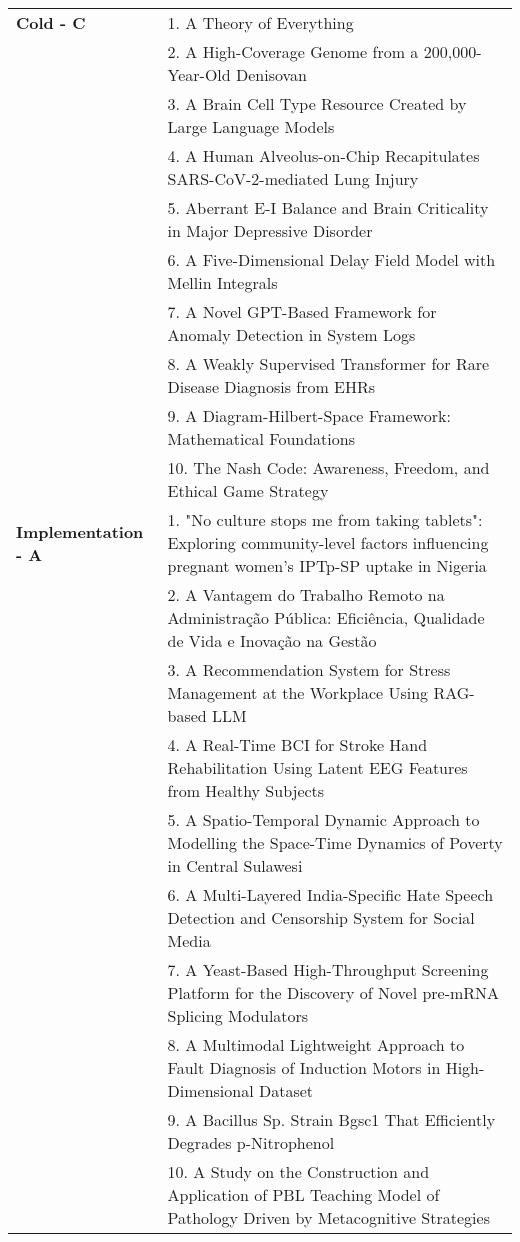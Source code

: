 \documentclass{article}
\begin{document}
\begin{longtable}{p{2.5cm}p{13cm}}
\textbf{Cold - C} & 1. A Theory of Everything \\
& 2. A High-Coverage Genome from a 200,000-Year-Old Denisovan \\
& 3. A Brain Cell Type Resource Created by Large Language Models \\
& 4. A Human Alveolus-on-Chip Recapitulates SARS-CoV-2-mediated Lung Injury \\
& 5. Aberrant E-I Balance and Brain Criticality in Major Depressive Disorder \\
& 6. A Five-Dimensional Delay Field Model with Mellin Integrals \\
& 7. A Novel GPT-Based Framework for Anomaly Detection in System Logs \\
& 8. A Weakly Supervised Transformer for Rare Disease Diagnosis from EHRs \\
& 9. A Diagram-Hilbert-Space Framework: Mathematical Foundations \\
& 10. The Nash Code: Awareness, Freedom, and Ethical Game Strategy \\
\midrule

\textbf{Implementation - A} & 1. "No culture stops me from taking tablets": Exploring community-level factors influencing pregnant women's IPTp-SP uptake in Nigeria \\
& 2. A Vantagem do Trabalho Remoto na Administração Pública: Eficiência, Qualidade de Vida e Inovação na Gestão \\
& 3. A Recommendation System for Stress Management at the Workplace Using RAG-based LLM \\
& 4. A Real-Time BCI for Stroke Hand Rehabilitation Using Latent EEG Features from Healthy Subjects \\
& 5. A Spatio-Temporal Dynamic Approach to Modelling the Space-Time Dynamics of Poverty in Central Sulawesi \\
& 6. A Multi-Layered India-Specific Hate Speech Detection and Censorship System for Social Media \\
& 7. A Yeast-Based High-Throughput Screening Platform for the Discovery of Novel pre-mRNA Splicing Modulators \\
& 8. A Multimodal Lightweight Approach to Fault Diagnosis of Induction Motors in High-Dimensional Dataset \\
& 9. A Bacillus Sp. Strain Bgsc1 That Efficiently Degrades p-Nitrophenol \\
& 10. A Study on the Construction and Application of PBL Teaching Model of Pathology Driven by Metacognitive Strategies \\
\midrule


\end{longtable}
\end{document}
